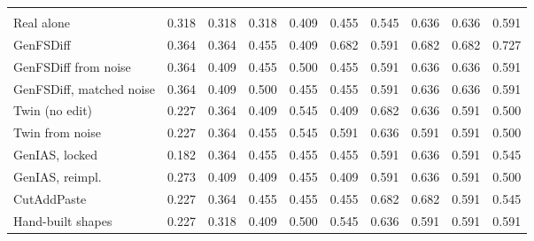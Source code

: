 \documentclass[11pt,a4paper]{article}
\begin{document}
\begin{table}[t]
\begin{tabular}{@{}lrrrrrrrrr@{}}
\addlinespace
\multicolumn{10}{@{}l}{\emph{Stratified draw}} \\
Real alone & 0.318 & 0.318 & 0.318 & 0.409 & 0.455 & 0.545 & 0.636 & 0.636 & 0.591 \\
GenFSDiff & 0.364 & 0.364 & 0.455 & 0.409 & 0.682 & 0.591 & 0.682 & 0.682 & 0.727 \\
GenFSDiff from noise & 0.364 & 0.409 & 0.455 & 0.500 & 0.455 & 0.591 & 0.636 & 0.636 & 0.591 \\
GenFSDiff, matched noise & 0.364 & 0.409 & 0.500 & 0.455 & 0.455 & 0.591 & 0.636 & 0.636 & 0.591 \\
Twin (no edit) & 0.227 & 0.364 & 0.409 & 0.545 & 0.409 & 0.682 & 0.636 & 0.591 & 0.500 \\
Twin from noise & 0.227 & 0.364 & 0.455 & 0.545 & 0.591 & 0.636 & 0.591 & 0.591 & 0.500 \\
GenIAS, locked & 0.182 & 0.364 & 0.455 & 0.455 & 0.455 & 0.591 & 0.636 & 0.591 & 0.545 \\
GenIAS, reimpl. & 0.273 & 0.409 & 0.409 & 0.455 & 0.409 & 0.591 & 0.636 & 0.591 & 0.500 \\
CutAddPaste & 0.227 & 0.364 & 0.455 & 0.455 & 0.455 & 0.682 & 0.682 & 0.591 & 0.545 \\
Hand-built shapes & 0.227 & 0.318 & 0.409 & 0.500 & 0.545 & 0.636 & 0.591 & 0.591 & 0.591 \\
\bottomrule
\end{tabular}
\end{table}
\end{document}
